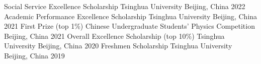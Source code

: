 


\begin{cvhonors}

  \cvhonor
    {Social Service Excellence Scholarship} %
    {Tsinghua University} %
    {Beijing, China} %
    {2022} %
  \cvhonor
    {Academic Performance Excellence Scholarship} %
    {Tsinghua University} %
    {Beijing, China} %
    {2021} %
  \cvhonor
    {First Prize (top 1\%)} %
    {Chinese Undergraduate Students’ Physics Competition} %
    {Beijing, China} %
    {2021} %
  \cvhonor
    {Overall Excellence Scholarship (top 10\%)} %
    {Tsinghua University} %
    {Beijing, China} %
    {2020} %
  \cvhonor
    {Freshmen Scholarship} %
    {Tsinghua University} %
    {Beijing, China} %
    {2019} %
\end{cvhonors}